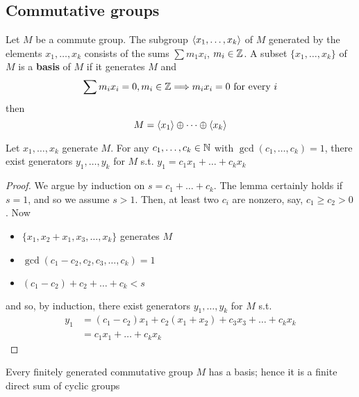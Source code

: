 \documentclass[11pt]{article}
\begin{document}
\subsection{Commutative groups}
\label{sec:org35b9519}
Let \(M\) be a commute group. The subgroup \(\langle x_1,\dots,x_k\rangle\) of \(M\) generated by the
elements \(x_1,\dots,x_k\) consists of the sums \(\sum m_1x_i\), \(m_i\in\mathbb{Z}\). A subset \(\{x_1,\dots,x_k\}\)
of \(M\) is a \textbf{basis} of \(M\) if it generates \(M\) and
\begin{equation*}
\sum m_ix_i=0,m_i\in\mathbb{Z}\Longrightarrow m_ix_i=0\text{ for every }i
\end{equation*}
then
\begin{equation*}
M=\langle x_1\rangle\oplus\dots\oplus\langle x_k\rangle
\end{equation*}

\begin{lemma}[]
Let \(x_1,\dots,x_k\) generate \(M\). For any \(c_1,\dots,c_k\in\mathbb{N}\) with \(\gcd(c_1,\dots,c_k)=1\), there exist
generators \(y_1,\dots,y_k\) for \(M\) s.t. \(y_1=c_1x_1+\dots+c_kx_k\)
\end{lemma}

\begin{proof}
We argue by induction on \(s=c_1+\dots+c_k\). The lemma certainly holds if \(s=1\), and so we
assume \(s>1\). Then, at least two \(c_i\) are nonzero, say, \(c_1\ge c_2>0\). Now
\begin{itemize}
\item \(\{x_1,x_2+x_1,x_3,\dots,x_k\}\) generates \(M\)
\item \(\gcd(c_1-c_2,c_2,c_3,\dots,c_k)=1\)
\item \((c_1-c_2)+c_2+\dots+c_k<s\)
\end{itemize}


and so, by induction, there exist generators \(y_1,\dots,y_k\) for \(M\) s.t.
\begin{align*}
y_1&=(c_1-c_2)x_1+c_2(x_1+x_2)+c_3x_3+\dots+c_kx_k\\
&=c_1x_1+\dots+c_kx_k
\end{align*}
\end{proof}

\begin{theorem}[]
\label{1.54}
Every finitely generated commutative group \(M\) has a basis; hence it is a finite direct sum of
cyclic groups
\end{theorem}
\end{document}
